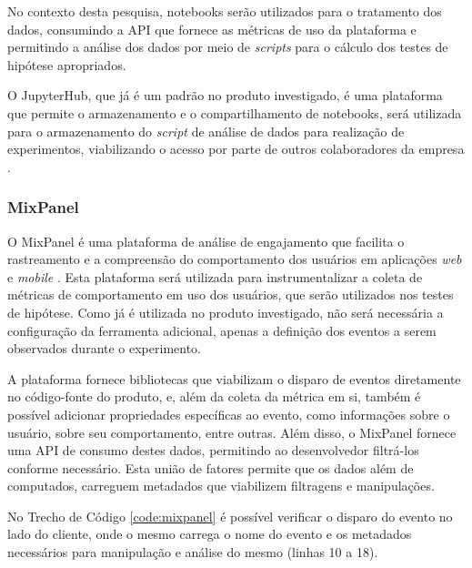 No contexto desta pesquisa, notebooks serão utilizados para o tratamento dos dados, consumindo a API que fornece as métricas de uso da plataforma e permitindo a análise dos dados por meio de \textit{scripts} para o cálculo dos testes de hipótese apropriados.

O JupyterHub, que já é um padrão no produto investigado, é uma plataforma que permite o armazenamento e o compartilhamento de notebooks, será utilizada para o armazenamento do \textit{script} de análise de dados para realização de experimentos, viabilizando o acesso por parte de outros colaboradores da empresa \cite{jupyterhub}.

\subsubsection{MixPanel}

O MixPanel é uma plataforma de análise de engajamento que facilita o rastreamento e a compreensão do comportamento dos usuários em aplicações \textit{web} e \textit{mobile} \cite{mixpanel2024}. Esta plataforma será utilizada para instrumentalizar a coleta de métricas de comportamento em uso dos usuários, que serão utilizados nos testes de hipótese. Como já é utilizada no produto investigado, não será necessária a configuração da ferramenta adicional, apenas a definição dos eventos a serem observados durante o experimento.

A plataforma fornece bibliotecas que viabilizam o disparo de eventos diretamente no código-fonte do produto, e, além da coleta da métrica em si, também é possível adicionar propriedades específicas ao evento, como informações sobre o usuário, sobre seu comportamento, entre outras. Além disso, o MixPanel fornece uma API de consumo destes dados, permitindo ao desenvolvedor filtrá-los conforme necessário. Esta união de fatores permite que os dados além de computados, carreguem metadados que viabilizem filtragens e manipulações.

No Trecho de Código \ref{code:mixpanel} é possível verificar o disparo do evento no lado do cliente, onde o mesmo carrega o nome do evento e os metadados necessários para manipulação e análise do mesmo (linhas 10 a 18).


